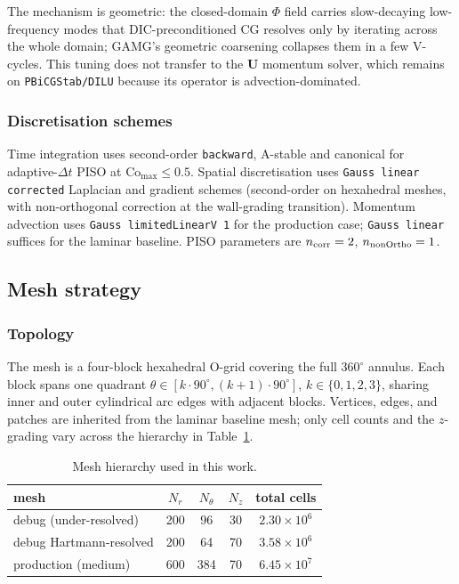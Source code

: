 \documentclass[aps,prl,twocolumn,superscriptaddress]{revtex4-2}
\begin{document}
The mechanism is geometric: the closed-domain $\Phi$ field carries
slow-decaying low-frequency modes that DIC-preconditioned CG resolves
only by iterating across the whole domain; GAMG's geometric coarsening
collapses them in a few V-cycles.  This tuning does not transfer to
the $\mathbf{U}$ momentum solver, which remains on
\texttt{PBiCGStab/DILU} because its operator is advection-dominated.

\subsubsection*{Discretisation schemes}
Time integration uses second-order \texttt{backward}, A-stable and
canonical for adaptive-$\Delta t$ PISO at $\mathrm{Co}_{\max}\le 0.5$.
Spatial discretisation uses \texttt{Gauss linear corrected} Laplacian
and gradient schemes (second-order on hexahedral meshes, with
non-orthogonal correction at the wall-grading transition).  Momentum
advection uses \texttt{Gauss limitedLinearV 1} for the production
case; \texttt{Gauss linear} suffices for the laminar baseline.  PISO
parameters are $n_{\rm corr} = 2$, $n_{\rm nonOrtho} = 1$.

\subsection{Mesh strategy}

\subsubsection*{Topology}
The mesh is a four-block hexahedral O-grid covering the full
$360^{\circ}$ annulus.  Each block spans one quadrant
$\theta\in[k\!\cdot\!90^{\circ},(k+1)\!\cdot\!90^{\circ}]$,
$k\in\{0,1,2,3\}$, sharing inner and outer cylindrical arc edges with
adjacent blocks.  Vertices, edges, and patches are inherited from the
laminar baseline mesh; only cell counts and the $z$-grading vary
across the hierarchy in Table~\ref{tab:meshes}.

\begin{table}[h!]
\centering
\caption{Mesh hierarchy used in this work.}
\label{tab:meshes}
\begin{tabular}{|l|c|c|c|c|}\hline
mesh & $N_r$ & $N_\theta$ & $N_z$ & total cells \\ \hline
debug (under-resolved) & 200 & 96 & 30 & $2.30\!\times\!10^{6}$ \\
debug Hartmann-resolved & 200 & 64 & 70 & $3.58\!\times\!10^{6}$ \\
production (medium) & 600 & 384 & 70 & $6.45\!\times\!10^{7}$ \\ \hline
\end{tabular}
\end{table}
\end{document}
